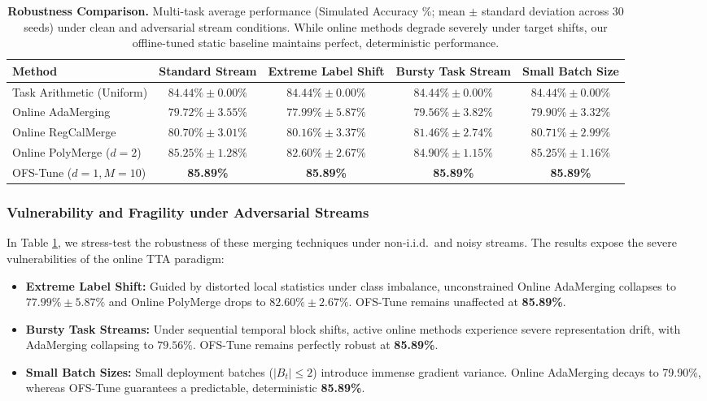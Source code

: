 \begin{table}[t]
\caption{\textbf{Robustness Comparison.} Multi-task average performance (Simulated Accuracy \%; mean $\pm$ standard deviation across 30 seeds) under clean and adversarial stream conditions. While online methods degrade severely under target shifts, our offline-tuned static baseline maintains perfect, deterministic performance.}
\label{tab:robustness_table}
\vskip 0.15in
\begin{center}
\begin{small}
\begin{sc}
\begin{tabular}{lcccc}
\toprule
Method & Standard Stream & Extreme Label Shift & Bursty Task Stream & Small Batch Size \\
\midrule
Task Arithmetic (Uniform) & $84.44\% \pm 0.00\%$ & $84.44\% \pm 0.00\%$ & $84.44\% \pm 0.00\%$ & $84.44\% \pm 0.00\%$ \\
Online AdaMerging & $79.72\% \pm 3.55\%$ & $77.99\% \pm 5.87\%$ & $79.56\% \pm 3.82\%$ & $79.90\% \pm 3.32\%$ \\
Online RegCalMerge & $80.70\% \pm 3.01\%$ & $80.16\% \pm 3.37\%$ & $81.46\% \pm 2.74\%$ & $80.71\% \pm 2.99\%$ \\
Online PolyMerge ($d=2$) & $85.25\% \pm 1.28\%$ & $82.60\% \pm 2.67\%$ & $84.90\% \pm 1.15\%$ & $85.25\% \pm 1.16\%$ \\
\midrule
OFS-Tune ($d=1, M=10$) & \textbf{85.89\%} & \textbf{85.89\%} & \textbf{85.89\%} & \textbf{85.89\%} \\
\bottomrule
\end{tabular}
\end{sc}
\end{small}
\end{center}
\vskip -0.1in
\end{table}

\subsubsection{Vulnerability and Fragility under Adversarial Streams}
In Table \ref{tab:robustness_table}, we stress-test the robustness of these merging techniques under non-i.i.d.\ and noisy streams. The results expose the severe vulnerabilities of the online TTA paradigm:
\begin{itemize}[leftmargin=*]
    \item \textbf{Extreme Label Shift:} Guided by distorted local statistics under class imbalance, unconstrained Online AdaMerging collapses to $77.99\% \pm 5.87\%$ and Online PolyMerge drops to $82.60\% \pm 2.67\%$. OFS-Tune remains unaffected at \textbf{85.89\%}.
    \item \textbf{Bursty Task Streams:} Under sequential temporal block shifts, active online methods experience severe representation drift, with AdaMerging collapsing to $79.56\%$. OFS-Tune remains perfectly robust at \textbf{85.89\%}.
    \item \textbf{Small Batch Sizes:} Small deployment batches ($|B_t| \le 2$) introduce immense gradient variance. Online AdaMerging decays to 79.90\%, whereas OFS-Tune guarantees a predictable, deterministic \textbf{85.89\%}.
\end{itemize}

